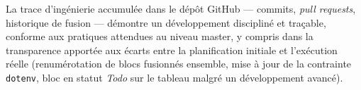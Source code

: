 \documentclass[12pt, a4paper]{article}
\begin{document}
La trace d'ingénierie accumulée dans le dépôt GitHub — commits, \textit{pull requests}, historique de fusion — démontre un développement discipliné et traçable, conforme aux pratiques attendues au niveau master, y compris dans la transparence apportée aux écarts entre la planification initiale et l'exécution réelle (renumérotation de blocs fusionnés ensemble, mise à jour de la contrainte \texttt{dotenv}, bloc en statut \textit{Todo} sur le tableau malgré un développement avancé).

\newpage
\printbibliography[title={Références}]
\end{document}
